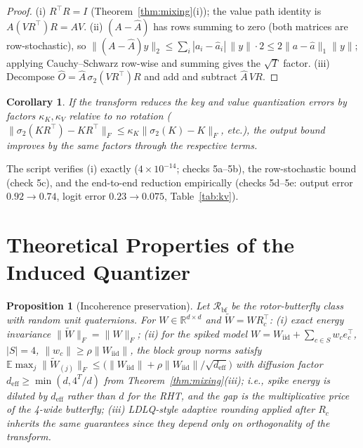 \documentclass{article}
\newtheorem{proposition}{Proposition}
\newtheorem{corollary}{Corollary}
\newcommand{\R}{\mathbb{R}}
\newcommand{\norm}[1]{\lVert #1 \rVert}
\begin{document}
\begin{proof}
(i) $R^\top R=I$ (Theorem~\ref{thm:mixing}(i)); the value path identity is
$A(VR^\top)R=AV$. (ii) $(A-\widehat A)$ has rows summing to zero
(both matrices are row-stochastic), so
$\norm{(A-\widehat A)y}_2\le\sum_i|a_i-\hat a_i|\,\norm{y}\cdot2\le
2\norm{a-\hat a}_1\norm{y}$; applying Cauchy--Schwarz row-wise and summing
gives the $\sqrt{T}$ factor. (iii) Decompose
$\widehat O=\widehat A\,\sigma_2(VR^\top)R$ and add and subtract
$\widehat A\,VR$.
\end{proof}

\begin{corollary}
\label{cor:kvbound}
If the transform reduces the key and value quantization errors by factors
$\kappa_K,\kappa_V$ relative to no rotation
($\norm{\sigma_2(KR^\top)-KR^\top}_F\le\kappa_K\norm{\sigma_2(K)-K}_F$, etc.),
the output bound improves by the same factors through the respective terms.
\end{corollary}

The script verifies (i) exactly ($4\times10^{-14}$; checks 5a--5b), the
row-stochastic bound (check 5c), and the end-to-end reduction empirically
(checks 5d--5e: output error $0.92\to0.74$, logit error $0.23\to0.075$,
Table~\ref{tab:kv}).

\section{Theoretical Properties of the Induced Quantizer}
\label{sec:theory}

\begin{proposition}[Incoherence preservation]
\label{prop:incoh}
Let $\mathcal{R}_{\mathrm{bf}}$ be the rotor-butterfly class with random unit
quaternions. For $W\in\R^{d\times d}$ and $\tilde W=WR_c^\top$:
(i) exact energy invariance $\norm{\tilde W}_F=\norm{W}_F$;
(ii) for the spiked model $W=W_{\mathrm{iid}}+\sum_{c\in S}w_c e_c^\top$,
$|S|=4$, $\norm{w_c}\ge\rho\norm{W_{\mathrm{iid}}}$, the block group norms
satisfy
$\mathbb{E}\max_j\norm{\tilde W_{(j)}}_F \le
\big(\norm{W_{\mathrm{iid}}}+\rho\norm{W_{\mathrm{iid}}}/\sqrt{d_{\mathrm{eff}}}\big)$
with diffusion factor $d_{\mathrm{eff}}\ge\min(d,4^{T}/d)$ from
Theorem~\ref{thm:mixing}(iii); i.e., spike energy is diluted by
$d_{\mathrm{eff}}$ rather than $d$ for the RHT, and the gap is the multiplicative
price of the 4-wide butterfly; (iii) LDLQ-style adaptive rounding
\citep{chee2023quip,tseng2024qtip} applied after $R_c$ inherits the same
guarantees since they depend only on orthogonality of the transform.
\end{proposition}
\end{document}
